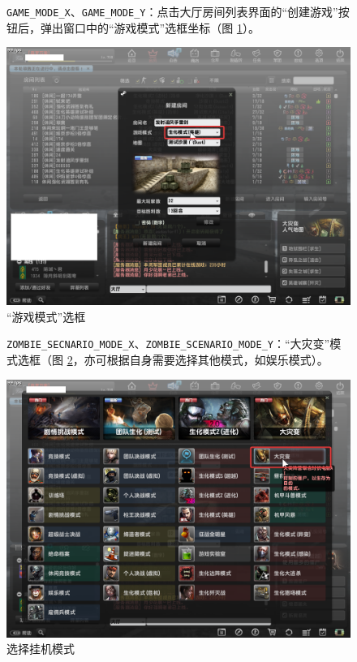 \begin{figure}[H]
    \Centering
    \parbox[l]{\textwidth}{\lstinline{GAME_MODE_X}、\lstinline{GAME_MODE_Y}：点击大厅房间列表界面的“创建游戏”按钮后，弹出窗口中的“游戏模式”选框坐标（图 \ref{ch2fig-game-mode}）。}
    \includegraphics[width=\textwidth]{docs/assets/game_mode.png}
    \caption{“游戏模式”选框}
    \label{ch2fig-game-mode}
\end{figure}


\begin{figure}[H]
    \Centering
    \parbox[l]{\textwidth}{\lstinline{ZOMBIE_SECNARIO_MODE_X}、\lstinline{ZOMBIE_SCENARIO_MODE_Y}：“大灾变”模式选框（图 \ref{ch2fig-zombie-scenario}，亦可根据自身需要选择其他模式，如娱乐模式）。}
    \includegraphics[width=\textwidth]{docs/assets/zombie_scenario.png}
    \caption{选择挂机模式}
    \label{ch2fig-zombie-scenario}
\end{figure}


